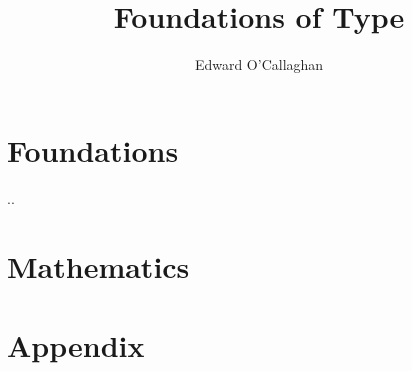 \documentclass{book}
\begin{document}
\title{Foundations of Type}
\author{Edward O'Callaghan}

\frontmatter

\pagestyle{empty}



\hypertarget{preface}{}

\pagestyle{fancyplain}



\hypertarget{toc}{}

\setcounter{tocdepth}{1} %
\tableofcontents
\setcounter{tocdepth}{2} %

\mainmatter
\pagestyle{fancyplain}





\part{Foundations}
\label{part:foundations}

..

\part{Mathematics}
\label{part:mathematics}




\cleartooddpage[\thispagestyle{empty}] %
\part*{Appendix}

\appendix

\renewcommand{\chaptermark}[1]{\markboth{\textsc{Appendix. \thechapter. #1}}{}}
\renewcommand{\sectionmark}[1]{\markright{\textsc{\thesection\ #1}}}
\end{document}
